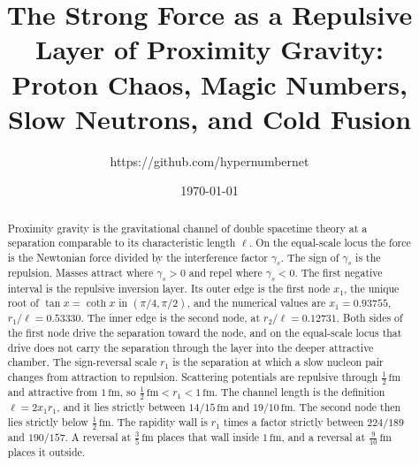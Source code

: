 \documentclass[a4paper]{article}
\title{The Strong Force as a Repulsive Layer of Proximity Gravity:\\
    Proton Chaos, Magic Numbers, Slow Neutrons, and Cold Fusion}
\author{https://github.com/hypernumbernet}
\date{\today}
\begin{document}
\maketitle

\begin{abstract}
Proximity gravity is the gravitational channel of double spacetime theory at a separation comparable to its characteristic length \(\ell\). On the equal-scale locus the force is the Newtonian force divided by the interference factor \(\gamma_s\). The sign of \(\gamma_s\) is the repulsion. Masses attract where \(\gamma_s>0\) and repel where \(\gamma_s<0\). The first negative interval is the repulsive inversion layer. Its outer edge is the first node \(x_1\), the unique root of \(\tan x=\coth x\) in \((\pi/4,\pi/2)\), and the numerical values are \(x_1=0.93755\), \(r_1/\ell=0.53330\). The inner edge is the second node, at \(r_2/\ell=0.12731\). Both sides of the first node drive the separation toward the node, and on the equal-scale locus that drive does not carry the separation through the layer into the deeper attractive chamber. The sign-reversal scale \(r_1\) is the separation at which a slow nucleon pair changes from attraction to repulsion. Scattering potentials are repulsive through \(\tfrac12\,\mathrm{fm}\) and attractive from \(1\,\mathrm{fm}\), so \(\tfrac12\,\mathrm{fm}<r_1<1\,\mathrm{fm}\). The channel length is the definition \(\ell=2x_1 r_1\), and it lies strictly between \(14/15\,\mathrm{fm}\) and \(19/10\,\mathrm{fm}\). The second node then lies strictly below \(\tfrac12\,\mathrm{fm}\). The rapidity wall is \(r_1\) times a factor strictly between \(224/189\) and \(190/157\). A reversal at \(\tfrac35\,\mathrm{fm}\) places that wall inside \(1\,\mathrm{fm}\), and a reversal at \(\tfrac9{10}\,\mathrm{fm}\) places it outside.


\end{abstract}
\end{document}
